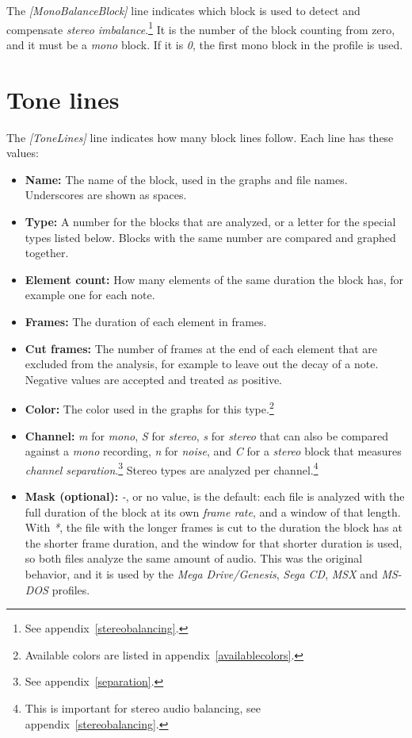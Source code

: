 \documentclass[10pt,a4paper]{report}
\begin{document}
\begin{appendices}
The \textit{[MonoBalanceBlock]} line indicates which block is used to detect and compensate \textit{stereo imbalance}.\footnote{See appendix~\ref{stereobalancing}.} It is the number of the block counting from zero, and it must be a \textit{mono} block. If it is \textit{0}, the first mono block in the profile is used.

\section{Tone lines}

The \textit{[ToneLines]} line indicates how many block lines follow. Each line has these values:

\begin{itemize}
	\item \textbf{Name:} The name of the block, used in the graphs and file names. Underscores are shown as spaces.
	\item \textbf{Type:} A number for the blocks that are analyzed, or a letter for the special types listed below. Blocks with the same number are compared and graphed together.
	\item \textbf{Element count:} How many elements of the same duration the block has, for example one for each note.
	\item \textbf{Frames:} The duration of each element in frames.
	\item \textbf{Cut frames:} The number of frames at the end of each element that are excluded from the analysis, for example to leave out the decay of a note. Negative values are accepted and treated as positive.
	\item \textbf{Color:} The color used in the graphs for this type.\footnote{Available colors are listed in appendix~\ref{availablecolors}.}
	\item \textbf{Channel:} \textit{m} for \textit{mono}, \textit{S} for \textit{stereo}, \textit{s} for \textit{stereo} that can also be compared against a \textit{mono} recording, \textit{n} for \textit{noise}, and \textit{C} for a \textit{stereo} block that measures \textit{channel separation}.\footnote{See appendix~\ref{separation}.} Stereo types are analyzed per channel.\footnote{This is important for stereo audio balancing, see appendix~\ref{stereobalancing}.}
	\item \textbf{Mask (optional):} \textit{-}, or no value, is the default: each file is analyzed with the full duration of the block at its own \textit{frame rate}, and a window of that length. With \textit{*}, the file with the longer frames is cut to the duration the block has at the shorter frame duration, and the window for that shorter duration is used, so both files analyze the same amount of audio. This was the original behavior, and it is used by the \textit{Mega Drive/Genesis}, \textit{Sega CD}, \textit{MSX} and \textit{MS-DOS} profiles.

\end{itemize}
\end{appendices}
\end{document}

